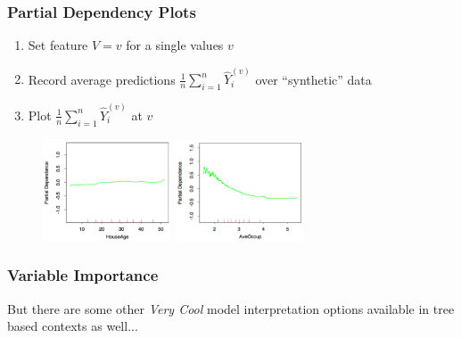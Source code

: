 \documentclass[xcolor={dvipsnames}]{beamer}
\begin{document}
\frame
{
 \frametitle{Partial Dependency Plots}

\vspace{.6em}
\begin{enumerate}
\item<1-> Set feature $V=v$ for a single values $v$
\item<2-> Record average predictions $ \frac{1}{n} \sum_{i=1}^n \hat Y_i^{(v)}$ over  ``synthetic'' data 
\item<3-> Plot $\frac{1}{n} \sum_{i=1}^n \hat Y_i^{(v)}$ at $v$ \\ 
\end{enumerate}


\begin{figure}
\centering
\includegraphics[width=1.5in]{stuffs/pd3.png}
\includegraphics[width=1.5in]{stuffs/pd4.png}\\
\end{figure}
}

\frame
{
 \frametitle{Variable Importance}

\huge
But there are some other \emph{Very Cool}
model interpretation options available in tree based contexts as well...

}
\end{document}
